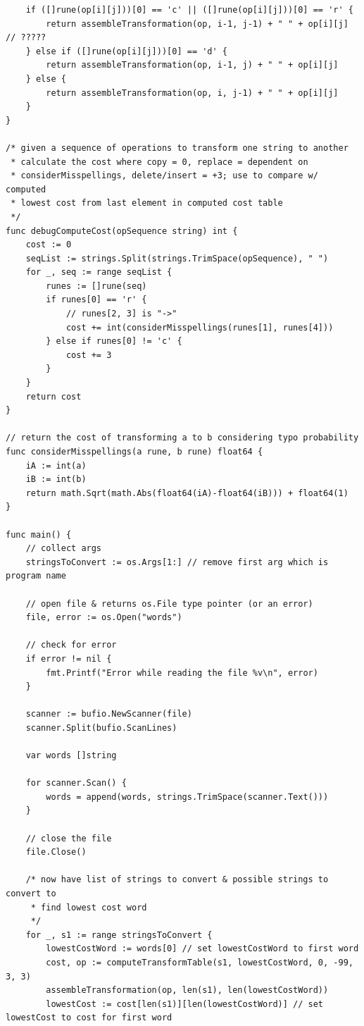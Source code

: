 \documentclass[12pt,letterpaper]{article}
\begin{document}
\begin{scriptsize}
\begin{verbatim}
    if ([]rune(op[i][j]))[0] == 'c' || ([]rune(op[i][j]))[0] == 'r' {
        return assembleTransformation(op, i-1, j-1) + " " + op[i][j] // ?????
    } else if ([]rune(op[i][j]))[0] == 'd' {
        return assembleTransformation(op, i-1, j) + " " + op[i][j]
    } else {
        return assembleTransformation(op, i, j-1) + " " + op[i][j]
    }
}
    
/* given a sequence of operations to transform one string to another
 * calculate the cost where copy = 0, replace = dependent on 
 * considerMisspellings, delete/insert = +3; use to compare w/ computed
 * lowest cost from last element in computed cost table
 */
func debugComputeCost(opSequence string) int {
    cost := 0
    seqList := strings.Split(strings.TrimSpace(opSequence), " ")
    for _, seq := range seqList {
        runes := []rune(seq)
        if runes[0] == 'r' {
            // runes[2, 3] is "->"
            cost += int(considerMisspellings(runes[1], runes[4]))
        } else if runes[0] != 'c' {
            cost += 3
        }
    }
    return cost
}
    
// return the cost of transforming a to b considering typo probability
func considerMisspellings(a rune, b rune) float64 {
    iA := int(a)
    iB := int(b)
    return math.Sqrt(math.Abs(float64(iA)-float64(iB))) + float64(1)
}
    
func main() {
    // collect args
    stringsToConvert := os.Args[1:] // remove first arg which is program name
    
    // open file & returns os.File type pointer (or an error)
    file, error := os.Open("words")
    
    // check for error
    if error != nil {
        fmt.Printf("Error while reading the file %v\n", error)
    }
    
    scanner := bufio.NewScanner(file)
    scanner.Split(bufio.ScanLines)
    
    var words []string
    
    for scanner.Scan() {
        words = append(words, strings.TrimSpace(scanner.Text()))
    }
    
    // close the file
    file.Close()
    
    /* now have list of strings to convert & possible strings to convert to
     * find lowest cost word
     */
    for _, s1 := range stringsToConvert {
        lowestCostWord := words[0] // set lowestCostWord to first word
        cost, op := computeTransformTable(s1, lowestCostWord, 0, -99, 3, 3)
        assembleTransformation(op, len(s1), len(lowestCostWord))
        lowestCost := cost[len(s1)][len(lowestCostWord)] // set lowestCost to cost for first word
        

\end{verbatim}
\end{scriptsize}
\end{document}
